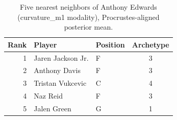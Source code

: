 \begin{table}[htbp]
  \centering\small
  \begin{tabular}{rllc}
    \toprule
    Rank & Player & Position & Archetype \\
    \midrule
    1 & Jaren Jackson Jr. & F & 3 \\
    2 & Anthony Davis & F & 3 \\
    3 & Tristan Vukcevic & C & 4 \\
    4 & Naz Reid & F & 3 \\
    5 & Jalen Green & G & 1 \\
    \bottomrule
  \end{tabular}
  \caption{Five nearest neighbors of Anthony Edwards (curvature_m1 modality), Procrustes-aligned posterior mean.}
  \label{tab:Anthony_Edwards_neighbors_curvature_m1}
\end{table}

